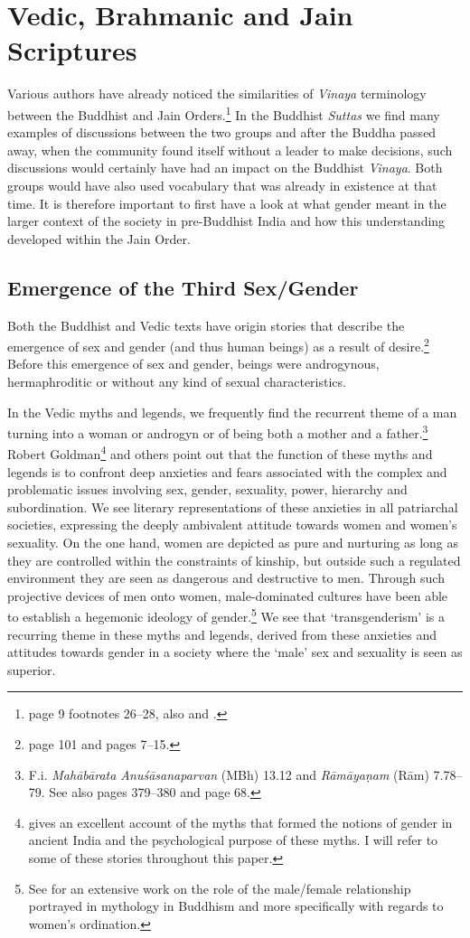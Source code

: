 \section{Vedic, Brahmanic and Jain Scriptures}

Various authors have already noticed the similarities of {\em Vinaya} terminology between the Buddhist and Jain Orders.\footnote{\cite{maes2016} page 9 footnotes 26–28, also \cite{sujato2009} and \cite{zwilling}.} In the Buddhist {\em Suttas} we find many examples of discussions between the two groups and after the Buddha passed away, when the community found itself without a leader to make decisions, such discussions would certainly have had an impact on the Buddhist {\em Vinaya}. Both groups would have also used vocabulary that was already in existence at that time. It is therefore important to first have a look at what gender meant in the larger context of the society in pre-Buddhist India and how this understanding developed within the Jain Order.

\subsection{Emergence of the Third Sex/Gender}
Both the Buddhist and Vedic texts have origin stories that describe the emergence of sex and gender (and thus human beings) as a result of desire.\footnote{\cite{zwilling2000} page 101 and \cite{artinger} pages 7–15.} Before this emergence of sex and gender, beings were androgynous, hermaphroditic or without any kind of sexual characteristics.

In the Vedic myths and legends, we frequently find the recurrent theme of a man turning into a woman or androgyn or of being both a mother and a father.\footnote{F.i. {\em Mahābārata Anuśāsanaparvan} (MBh) 13.12 and {\em Rāmāyaṇam} (Rām) 7.78–79. See also \cite{goldman} pages 379–380 and \cite{cassell} page 68.} Robert Goldman\footnote{\cite{goldman} gives an excellent account of the myths that formed the notions of gender in ancient India and the psychological purpose of these myths. I will refer to some of these stories throughout this paper.} and others point out that the function of these myths and legends is to confront deep anxieties and fears associated with the complex and problematic issues involving sex, gender, sexuality, power, hierarchy and subordination. We see literary representations of these anxieties in all patriarchal societies, expressing the deeply ambivalent attitude towards women and women's sexuality. On the one hand, women are depicted as pure and nurturing as long as they are controlled within the constraints of kinship, but outside such a regulated environment they are seen as dangerous and destructive to men. Through such projective devices of men onto women, male-dominated cultures have been able to establish a hegemonic ideology of gender.\footnote{See \cite{sujato2011} for an extensive work on the role of the male/female relationship portrayed in mythology in Buddhism and more specifically with regards to women's ordination.} We see that `transgenderism' is a recurring theme in these myths and legends, derived from these anxieties and attitudes towards gender in a society where the `male' sex and sexuality is seen as superior.

